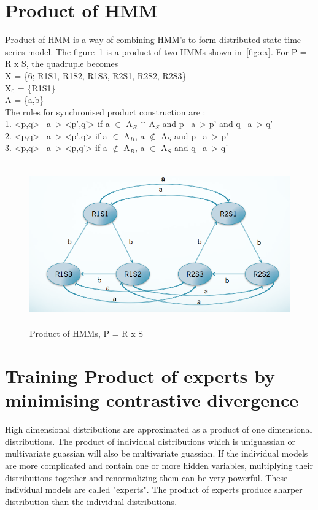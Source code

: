 \documentclass[letterpaper]{article}
\begin{document}
\section{Product of HMM}
\label {sec:pohmm}
Product of HMM is a way of combining HMM's to form distributed state time series model. The figure~\ref{fig:pohmm} is a product of two HMMs shown in~\ref{fig:ex}. For  P = R x S, the quadruple becomes\\
X = \{6; R1S1, R1S2, R1S3, R2S1, R2S2, R2S3\} \\
X$_{0}$ = \{R1S1\} \\
A = \{a,b\} \\
The rules for synchronised product construction are : \\
1. <p,q> --a--> <p',q'> if a $\in$ A$_{R}$ $\cap$ A$_{S}$ and p --a--> p' and q --a--> q'	\\
2. <p,q> --a--> <p',q> if a $\in$ A$_{R}$, a $\notin$ A$_{S}$ and p --a--> p'	\\
3. <p,q> --a--> <p,q'> if a $\notin$ A$_{R}$, a $\in$ A$_{S}$ and q --a--> q'	\\

\begin{figure}[t]
\centering
\includegraphics[width=12cm,height=7cm]{product.png}
\caption{Product of HMMs, P = R x S}
\label{fig:pohmm}
\end{figure}

\section{Training Product of experts by minimising contrastive divergence}
High dimensional distributions are approximated as a product of one dimensional distributions. The product of individual distributions which is uniguassian or multivariate guassian will also be multivariate guassian. If the individual models are more complicated and contain one or more hidden variables, multiplying their distributions together and renormalizing them can be very powerful. These individual models are called "experts".
The product of experts produce sharper distribution than the individual distributions\cite{hinton2000}.
\end{document}
